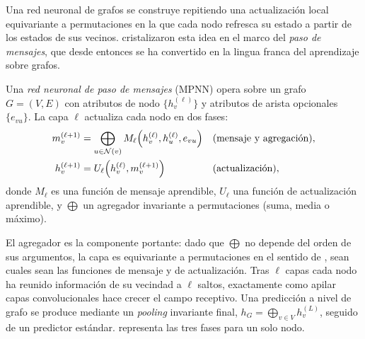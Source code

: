 Una red neuronal de grafos se construye repitiendo una actualizaci\'on local
equivariante a permutaciones en la que cada nodo refresca su estado a partir de
los estados de sus vecinos. \citet{gilmer2017neural} cristalizaron esta idea en el
marco del \emph{paso de mensajes}, que desde entonces se ha convertido en la
lingua franca del aprendizaje sobre grafos.

\begin{definition}
\label{def:graphs:mpnn}
Una \emph{red neuronal de paso de mensajes} (MPNN) opera sobre un grafo
$G = (V, E)$ con atributos de nodo $\{h_v^{(\ell)}\}$ y atributos de arista
opcionales $\{e_{vu}\}$. La capa $\ell$ actualiza cada nodo en dos fases:
\begin{align}
  m_v^{(\ell+1)} &= \bigoplus_{u \in \mathcal{N}(v)}
      M_\ell\!\left(h_v^{(\ell)}, h_u^{(\ell)}, e_{vu}\right)
      && \text{(mensaje y agregaci\'on)}, \\
  h_v^{(\ell+1)} &= U_\ell\!\left(h_v^{(\ell)}, m_v^{(\ell+1)}\right)
      && \text{(actualizaci\'on)},
\end{align}
donde $M_\ell$ es una funci\'on de mensaje aprendible, $U_\ell$ una funci\'on de
actualizaci\'on aprendible, y $\bigoplus$ un agregador invariante a permutaciones
(suma, media o m\'aximo).
\end{definition}

El agregador es la componente portante: dado que $\bigoplus$ no depende del orden
de sus argumentos, la capa es equivariante a permutaciones en el sentido de
, sean cuales sean las funciones de mensaje y de
actualizaci\'on. Tras $\ell$ capas cada nodo ha reunido informaci\'on de su
vecindad a $\ell$ saltos, exactamente como apilar capas convolucionales hace
crecer el campo receptivo. Una predicci\'on a nivel de grafo se produce mediante
un \emph{pooling} invariante final, $h_G = \bigoplus_{v \in V} h_v^{(L)}$, seguido
de un predictor est\'andar.  representa las tres
fases para un solo nodo.

